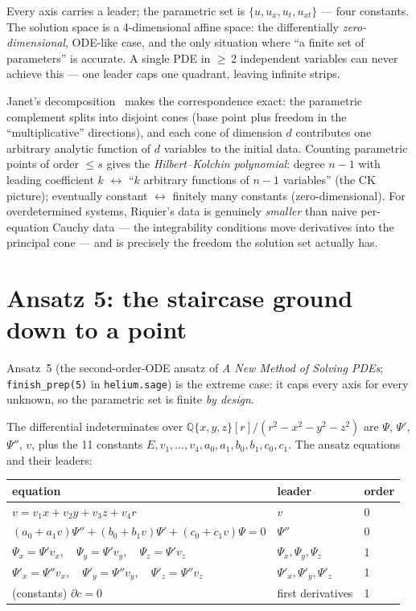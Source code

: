 \documentclass[11pt]{article}
\newcommand{\code}[1]{\texttt{#1}}
\begin{document}
Every axis carries a leader; the parametric set is
$\{u, u_x, u_t, u_{xt}\}$ --- four constants.  The solution space is a
4-dimensional affine space: the differentially \emph{zero-dimensional},
ODE-like case, and the only situation where ``a finite set of
parameters'' is accurate.  A single PDE in ${\ge}\,2$ independent
variables can never achieve this --- one leader caps one quadrant,
leaving infinite strips.

Janet's decomposition~\cite{janet} makes the correspondence exact: the
parametric complement splits into disjoint cones (base point plus freedom
in the ``multiplicative'' directions), and each cone of dimension $d$
contributes one arbitrary analytic function of $d$ variables to the
initial data.  Counting parametric points of order $\le s$ gives the
\emph{Hilbert--Kolchin polynomial}: degree $n-1$ with leading coefficient
$k$ $\leftrightarrow$ ``$k$ arbitrary functions of $n-1$ variables'' (the
CK picture); eventually constant $\leftrightarrow$ finitely many
constants (zero-dimensional).  For overdetermined systems, Riquier's data
is genuinely \emph{smaller} than naive per-equation Cauchy data --- the
integrability conditions move derivatives into the principal cone --- and
is precisely the freedom the solution set actually has.

\section{Ansatz 5: the staircase ground down to a point}

Ansatz~5 (the second-order-ODE ansatz of \emph{A New Method of Solving
PDEs}; \code{finish\_prep(5)} in \code{helium.sage}) is the extreme case:
it caps every axis for every unknown, so the parametric set is finite
\emph{by design}.

The differential indeterminates over
$\mathbb{Q}\{x,y,z\}[r]/(r^2-x^2-y^2-z^2)$ are $\Psi$, $\Psi'$, $\Psi''$,
$v$, plus the 11 constants
$E, v_1,\ldots,v_4, a_0,a_1,b_0,b_1,c_0,c_1$.  The ansatz equations and
their leaders:

\begin{center}
\begin{tabular}{lll}
\toprule
equation & leader & order \\
\midrule
$v = v_1x+v_2y+v_3z+v_4r$ & $v$ & 0 \\
$(a_0{+}a_1v)\Psi'' + (b_0{+}b_1v)\Psi' + (c_0{+}c_1v)\Psi = 0$
  & $\Psi''$ & 0 \\
$\Psi_x=\Psi'v_x,\quad \Psi_y=\Psi'v_y,\quad \Psi_z=\Psi'v_z$
  & $\Psi_x,\Psi_y,\Psi_z$ & 1 \\
$\Psi'_x=\Psi''v_x,\quad \Psi'_y=\Psi''v_y,\quad \Psi'_z=\Psi''v_z$
  & $\Psi'_x,\Psi'_y,\Psi'_z$ & 1 \\
(constants) $\partial c=0$ & first derivatives & 1 \\
\bottomrule
\end{tabular}
\end{center}
\end{document}
